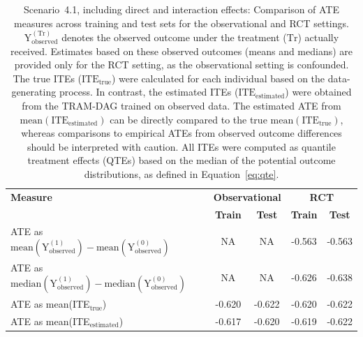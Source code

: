 

\begin{table}[htbp]
\centering
\small
\caption{Scenario~4.1, including direct and interaction effects: Comparison of ATE measures across training and test sets for the observational and RCT settings. $\text{Y}_\text{observed}^{(\text{Tr})}$ denotes the observed outcome under the treatment ($\text{Tr}$) actually received. Estimates based on these observed outcomes (means and medians) are provided only for the RCT setting, as the observational setting is confounded. The true ITEs ($\text{ITE}_\text{true}$) were calculated for each individual based on the data-generating process. In contrast, the estimated ITEs ($\text{ITE}_\text{estimated}$) were obtained from the TRAM-DAG trained on observed data. The estimated ATE from $\text{mean}(\text{ITE}_\text{estimated})$ can be directly compared to the true $\text{mean}(\text{ITE}_\text{true})$, whereas comparisons to empirical ATEs from observed outcome differences should be interpreted with caution. All ITEs were computed as quantile treatment effects (QTEs) based on the median of the potential outcome distributions, as defined in Equation~\ref{eq:qte}.}
\label{tab:scenario1_ate_comparison}
\begin{tabular}{l c c c c}
\toprule
\textbf{Measure} & \multicolumn{2}{c}{\textbf{Observational}} & \multicolumn{2}{c}{\textbf{RCT}} \\
\cmidrule(lr){2-3} \cmidrule(lr){4-5}
 & \textbf{Train} & \textbf{Test} & \textbf{Train} & \textbf{Test} \\
\midrule
ATE as $\text{mean}(\text{Y}_\text{observed}^{(1)}) - \text{mean}(\text{Y}_\text{observed}^{(0)})$ 
& NA & NA 
& -0.563 
& -0.563 \\

ATE as $\text{median}(\text{Y}_\text{observed}^{(1)}) - \text{median}(\text{Y}_\text{observed}^{(0)})$  
& NA & NA 
& -0.626 
& -0.638 \\

ATE as mean(ITE$_\text{true}$)  
& -0.620 
& -0.622 
& -0.620 
& -0.622 \\

ATE as mean(ITE$_\text{estimated}$) 
& -0.617 
& -0.620 
& -0.619 
& -0.622 \\
\bottomrule
\end{tabular}
\end{table}

